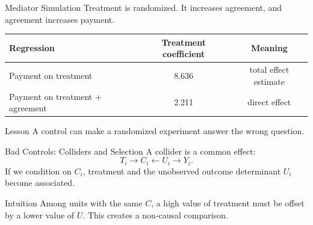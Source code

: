 \documentclass[11pt,aspectratio=169]{beamer}
\newcommand{\derivbutton}[1]{\vspace{0.4em}\hfill\hyperlink{app:#1}{\beamerbutton{Appendix details}}}
\begin{document}
\begin{frame}{Mediator Simulation}
  Treatment is randomized. It increases agreement, and agreement increases payment.
  \vspace{0.3em}

  \begin{center}
    \small
    \begin{tabular}{@{}lcc@{}}
      \toprule
      Regression & Treatment coefficient & Meaning \\
      \midrule
      Payment on treatment & 8.636 & total effect estimate \\
      Payment on treatment + agreement & 2.211 & direct effect \\
      \bottomrule
    \end{tabular}
  \end{center}
  \vspace{0.3em}
  \begin{block}{Lesson}
    A control can make a randomized experiment answer the wrong question.
  \end{block}
\end{frame}

\begin{frame}{Bad Controls: Colliders and Selection}
  \hypertarget{main:collider}{}
  A collider is a common effect:
  \[
    T_i \rightarrow C_i \leftarrow U_i \rightarrow Y_i.
  \]
  If we condition on \(C_i\), treatment and the unobserved outcome determinant \(U_i\) become associated.
  \vspace{0.3em}

  \begin{block}{Intuition}
    Among units with the same \(C\), a high value of treatment must be offset by a lower value of \(U\). This creates a non-causal comparison.
  \end{block}
  \derivbutton{collider}
\end{frame}
\end{document}
